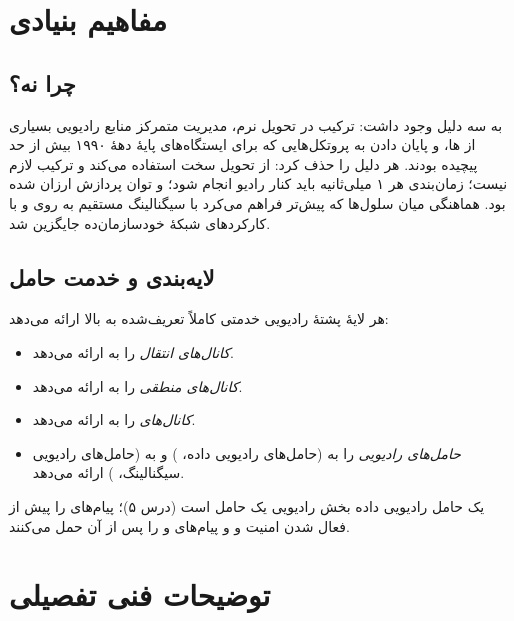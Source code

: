 \documentclass[11pt,a4paper]{article}
\begin{document}
\section{مفاهیم بنیادی}

\subsection{چرا  نه؟}
 به سه دلیل وجود داشت: ترکیب در تحویل نرم، مدیریت متمرکز منابع رادیویی بسیاری از ها،
و پایان دادن به پروتکل‌هایی که برای ایستگاه‌های پایهٔ دههٔ ۱۹۹۰ بیش از حد پیچیده بودند.  هر
دلیل را حذف کرد:  از تحویل سخت استفاده می‌کند و ترکیب لازم نیست؛ زمان‌بندی هر ۱ میلی‌ثانیه
باید کنار رادیو انجام شود؛ و توان پردازش ارزان شده بود. هماهنگی میان سلول‌ها که پیش‌تر  فراهم
می‌کرد با سیگنالینگ مستقیم  به  روی  و با کارکردهای شبکهٔ خودسازمان‌ده جایگزین شد.

\subsection{لایه‌بندی و خدمت حامل}
هر لایهٔ پشتهٔ رادیویی خدمتی کاملاً تعریف‌شده به بالا ارائه می‌دهد:
\begin{itemize}
  \item \textbf{} \emph{کانال‌های انتقال} را به  ارائه می‌دهد.
  \item \textbf{} \emph{کانال‌های منطقی} را به  ارائه می‌دهد.
  \item \textbf{} \emph{کانال‌های } را به  ارائه می‌دهد.
  \item \textbf{} \emph{حامل‌های رادیویی} را به  (حامل‌های رادیویی داده، ) و به
         (حامل‌های رادیویی سیگنالینگ، ) ارائه می‌دهد.
\end{itemize}
یک حامل رادیویی داده بخش رادیویی یک حامل  است (درس ۵)؛  پیام‌های  را پیش از
فعال شدن امنیت و  و  پیام‌های  و  را پس از آن حمل می‌کنند.

\section{توضیحات فنی تفصیلی}
\end{document}

